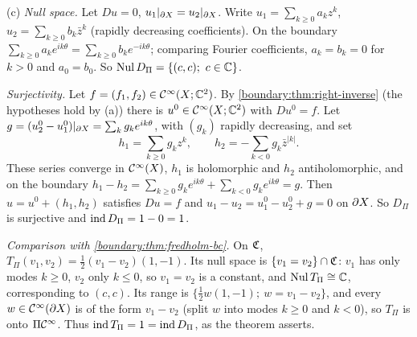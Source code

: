 (c) \emph{Null space.} Let $Du=0$, $u_1|_{\partial X}=u_2|_{\partial X}$. Write $u_1=\sum_{k\ge0}a_k
z^k$, $u_2=\sum_{k\ge0}b_k\bar z^k$ (rapidly decreasing coefficients). On the boundary
$\sum_{k\ge0}a_ke^{ik\theta}=\sum_{k\ge0}b_ke^{-ik\theta}$; comparing Fourier coefficients,
$a_k=b_k=0$ for $k>0$ and $a_0=b_0$. So $\operatorname{Nul} D_\Pi=\{(c,c);\ c\in\mathbb{C}\}$.

\emph{Surjectivity.} Let $f=(f_1,f_2)\in\mathcal{C}^\infty(X;\mathbb{C}^2)$. By \cref{boundary:thm:right-inverse}
(the hypotheses hold by (a)) there is $u^0\in\mathcal{C}^\infty(X;\mathbb{C}^2)$ with $Du^0=f$. Let
$g=(u^0_2-u^0_1)|_{\partial X}=\sum_kg_ke^{ik\theta}$, with $(g_k)$ rapidly decreasing, and set
\begin{equation*}
h_1=\sum_{k\ge0}g_kz^k,\qquad h_2=-\sum_{k<0}g_k\bar z^{|k|}.
\end{equation*}
These series converge in $\mathcal{C}^\infty(X)$, $h_1$ is holomorphic and $h_2$ antiholomorphic, and on
the boundary $h_1-h_2=\sum_{k\ge0}g_ke^{ik\theta}+\sum_{k<0}g_ke^{ik\theta}=g$. Then
$u=u^0+(h_1,h_2)$ satisfies $Du=f$ and $u_1-u_2=u^0_1-u^0_2+g=0$ on $\partial X$. So $D_\Pi$
is surjective and $\operatorname{ind} D_\Pi=1-0=1$.

\emph{Comparison with \cref{boundary:thm:fredholm-bc}.} On $\mathfrak{C}$, $T_\Pi(v_1,v_2)=
\frac12(v_1-v_2)(1,-1)$. Its null space is $\{v_1=v_2\}\cap\mathfrak{C}$: $v_1$ has only modes
$k\ge0$, $v_2$ only $k\le0$, so $v_1=v_2$ is a constant, and $\operatorname{Nul} T_\Pi\cong\mathbb{C}$,
corresponding to $(c,c)$. Its range is $\{\frac12w(1,-1);\ w=v_1-v_2\}$, and every
$w\in\mathcal{C}^\infty(\partial X)$ is of the form $v_1-v_2$ (split $w$ into modes $k\ge0$ and $k<0$), so
$T_\Pi$ is onto $\Pi\mathcal{C}^\infty$. Thus $\operatorname{ind} T_\Pi=1=\operatorname{ind} D_\Pi$, as the theorem asserts.
